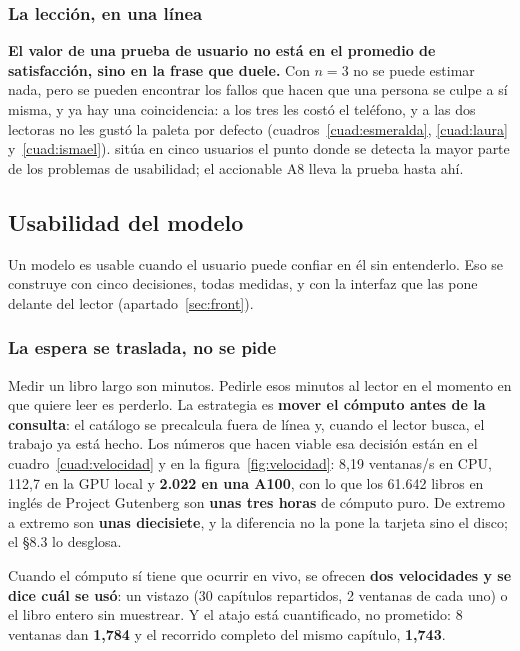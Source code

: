 \documentclass[11pt,a4paper]{article}
\begin{document}
\subsubsection{La lección, en una línea}

\textbf{El valor de una prueba de usuario no está en el promedio de satisfacción, sino
en la frase que duele.} Con $n = 3$ no se puede estimar nada, pero se pueden encontrar
los fallos que hacen que una persona se culpe a sí misma, y ya hay una coincidencia: a los
tres les costó el teléfono, y a las dos lectoras no les gustó la paleta por defecto
(cuadros~\ref{cuad:esmeralda}, \ref{cuad:laura} y~\ref{cuad:ismael}). \textcite{nielsen2000five}
sitúa en cinco usuarios el punto donde se detecta la mayor parte de los problemas de
usabilidad; el accionable A8 lleva la prueba hasta ahí.

\subsection{Usabilidad del modelo}

Un modelo es usable cuando el usuario puede confiar en él sin entenderlo. Eso se
construye con cinco decisiones, todas medidas, y con la interfaz que las pone delante del
lector (apartado~\ref{sec:front}).

\subsubsection{La espera se traslada, no se pide}

Medir un libro largo son minutos. Pedirle esos minutos al lector en el momento en que
quiere leer es perderlo. La estrategia es \textbf{mover el cómputo antes de la
consulta}: el catálogo se precalcula fuera de línea y, cuando el lector busca, el
trabajo ya está hecho. Los números que hacen viable esa decisión están en el
cuadro~\ref{cuad:velocidad} y en la figura~\ref{fig:velocidad}: 8,19 ventanas/s en CPU,
112,7 en la GPU local y \textbf{2.022 en una A100}, con lo que los 61.642 libros en
inglés de Project Gutenberg son \textbf{unas tres horas} de cómputo puro. De extremo
a extremo son \textbf{unas diecisiete}, y la diferencia no la pone la tarjeta sino el
disco; el §8.3 lo desglosa.

Cuando el cómputo sí tiene que ocurrir en vivo, se ofrecen \textbf{dos velocidades y se
dice cuál se usó}: un vistazo (30 capítulos repartidos, 2 ventanas de cada uno) o el
libro entero sin muestrear. Y el atajo está cuantificado, no prometido: 8 ventanas dan
\textbf{1,784} y el recorrido completo del mismo capítulo, \textbf{1,743}.
\end{document}
